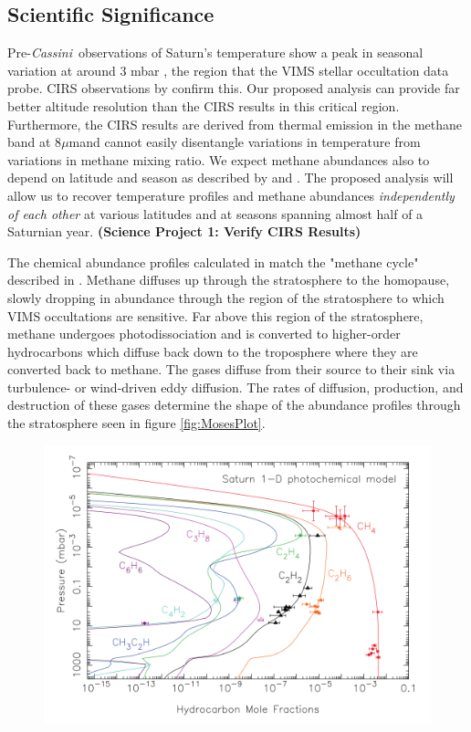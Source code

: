 \documentclass[preprint]{aastex}
\newcommand{\microns}{$\mu$m}     %
\newcommand{\Cas}{{\it Cassini}}
\begin{document}
\begin{multicols}{2}
\vspace{-9mm}
\section{Scientific Significance}
\vspace{-3mm}

Pre-\Cas~observations of Saturn's temperature show a peak in seasonal variation
at around 3 mbar \citep{Yanamandra2005}, the
region that the VIMS stellar occultation data probe.  CIRS observations by
\cite{Flasar2004, Flasar2005, Fletcher2007} 
confirm this. Our proposed analysis can provide far better altitude resolution
than the CIRS results in this critical region. Furthermore, the CIRS results
are derived from thermal emission in the methane band at 8\microns and cannot
easily disentangle variations in temperature from variations in methane mixing
ratio.  We expect methane abundances also to depend on latitude and season as
described by \cite{Moses05} and \cite{Fouchet09}.  The proposed analysis will
allow us to recover temperature profiles and methane abundances {\it
independently of each other} at various latitudes and at seasons spanning
almost half of a Saturnian year. {\bf (Science Project 1: Verify CIRS Results)}

The chemical abundance profiles calculated in \cite{Moses05} match the "methane
cycle" described in \cite{Strobel69}. Methane diffuses up through the
stratosphere to the homopause, slowly dropping in abundance through the region
of the stratosphere to which VIMS occultations are sensitive. Far above this
region of the stratosphere, methane undergoes photodissociation and is
converted to higher-order hydrocarbons which diffuse back down to the
troposphere where they are converted back to methane. The gases diffuse from
their source to their sink via turbulence- or wind-driven eddy diffusion. The
rates of diffusion, production, and destruction of these gases determine the
shape of the abundance profiles through the stratosphere seen in figure
\ref{fig:MosesPlot}.

\begin{figure}[ht]
\centering
\includegraphics[width=\linewidth]{./figs/Fouchet09.png}


\end{figure}
\end{multicols}
\end{document}
